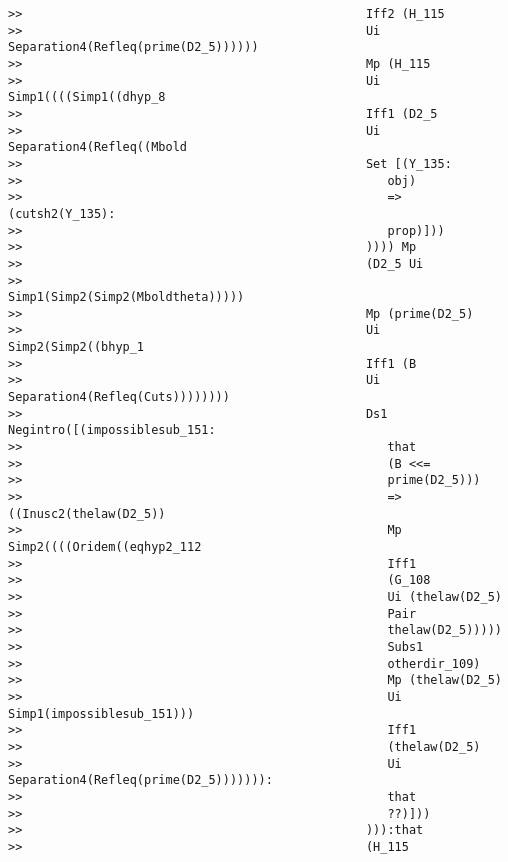 \documentclass[12pt]{article}
\begin{document}
\begin{verbatim}
>>                                                Iff2 (H_115
>>                                                Ui Separation4(Refleq(prime(D2_5))))))
>>                                                Mp (H_115
>>                                                Ui Simp1((((Simp1((dhyp_8
>>                                                Iff1 (D2_5
>>                                                Ui Separation4(Refleq((Mbold
>>                                                Set [(Y_135:
>>                                                   obj)
>>                                                   => (cutsh2(Y_135):
>>                                                   prop)]))
>>                                                )))) Mp
>>                                                (D2_5 Ui
>>                                                Simp1(Simp2(Simp2(Mboldtheta)))))
>>                                                Mp (prime(D2_5)
>>                                                Ui Simp2(Simp2((bhyp_1
>>                                                Iff1 (B
>>                                                Ui Separation4(Refleq(Cuts))))))))
>>                                                Ds1 Negintro([(impossiblesub_151:
>>                                                   that
>>                                                   (B <<=
>>                                                   prime(D2_5)))
>>                                                   => ((Inusc2(thelaw(D2_5))
>>                                                   Mp Simp2((((Oridem((eqhyp2_112
>>                                                   Iff1
>>                                                   (G_108
>>                                                   Ui (thelaw(D2_5)
>>                                                   Pair
>>                                                   thelaw(D2_5)))))
>>                                                   Subs1
>>                                                   otherdir_109)
>>                                                   Mp (thelaw(D2_5)
>>                                                   Ui Simp1(impossiblesub_151)))
>>                                                   Iff1
>>                                                   (thelaw(D2_5)
>>                                                   Ui Separation4(Refleq(prime(D2_5))))))):
>>                                                   that
>>                                                   ??)]))
>>                                                ))):that
>>                                                (H_115

\end{verbatim}
\end{document}
